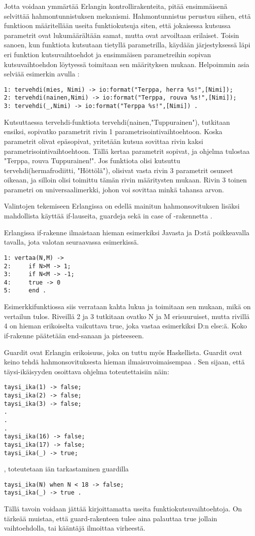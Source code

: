 \documentclass[11pt,oneside,a4paper]{article}
\begin{document}
Jotta voidaan ymmärtää Erlangin kontrollirakenteita, pitää ensimmäisenä
selvittää hahmontunnistuksen mekanismi. Hahmontunnistus perustuu siihen, että
funktioon määritellään useita funktiokutsuja siten, että jokaisessa kutsussa
parametrit ovat lukumäärältään samat, mutta ovat arvoiltaan erilaiset. Toisin sanoen, kun 
funktiota kutsutaan tietyllä parametrilla, käydään järjestyksessä läpi eri
funktion kutsuvaihtoehdot ja ensimmäisen parametreihin sopivan
kutsuvaihtoehdon löytyessä toimitaan sen määrityksen mukaan. Helpoimmin asia
selviää esimerkin avulla \cite{HEB13}: 
\begin{verbatim}
1: tervehdi(mies, Nimi) -> io:format("Terppa, herra %s!",[Nimi]);
2: tervehdi(nainen,Nimi) -> io:format("Terppa, rouva %s!",[Nimi]);
3: tervehdi(_,Nimi) -> io:format("Terppa %s!",[Nimi]) . 
\end{verbatim}
Kutsuttaessa tervehdi-funktiota tervehdi(nainen,"Tuppurainen"), tutkitaan
ensiksi, sopivatko parametrit rivin 1 parametrisointivaihtoehtoon. Koska
parametrit olivat epäsopivat, 
yritetään kutsua sovittaa rivin kaksi parametrisointivaihtoehtoon. Tällä kertaa
parametrit sopivat, ja ohjelma tulostaa "Terppa, rouva Tuppurainen!". Jos
funktiota olisi kutsuttu
tervehdi(hermafrodiitti, "Höttölä"), olisivat vasta rivin 3 parametrit osuneet
oikeaan, ja silloin olisi toimittu tämän rivin määritysten mukaan. 
Rivin 3 toinen parametri on universaalimerkki, 
johon voi sovittaa minkä tahansa arvon.

Valintojen tekemiseen Erlangissa on edellä mainitun hahmonsovituksen lisäksi
mahdollista
käyttää if-lauseita, guardeja sekä in case of -rakennetta \cite{HEB13}.

Erlangissa if-rakenne ilmaistaan hieman esimerkiksi Javasta ja D:stä
poikkeavalla
tavalla, jota valotan seuraavassa esimerkissä. 

\begin{verbatim}
1: vertaa(N,M) -> 
2:     if N>M -> 1;
3:     if N<M -> -1;
4:     true -> 0
5:     end . 
\end{verbatim}
Esimerkkifunktiossa siis verrataan kahta lukua ja toimitaan sen
mukaan, mikä on vertailun tulos. Riveillä 2 ja 3 tutkitaan ovatko N ja M
erisuuruiset, mutta rivillä 4 on hieman erikoiselta
vaikuttava true, joka vastaa esimerkiksi D:n else:ä. Koko if-rakenne päätetään
end-sanaan ja pisteeseen. 

Guardit ovat Erlangin erikoisuus, joka on tuttu myös Haskellista. Guardit
ovat keino tehdä hahmonsovituksesta hieman ilmaisuvoimaisempaa \cite{HEB13}. Sen
sijaan, että
täysi-ikäisyyden osoittava ohjelma 
toteutettaisiin näin: 
\begin{verbatim}
taysi_ika(1) -> false;
taysi_ika(2) -> false;
taysi_ika(3) -> false;
.
.
.
taysi_ika(16) -> false;
taysi_ika(17) -> false;
taysi_ika(_) -> true;
\end{verbatim}
, toteutetaan iän tarkastaminen guardilla
\begin{verbatim}
taysi_ika(N) when N < 18 -> false;
taysi_ika(_) -> true . 
\end{verbatim}
Tällä tavoin voidaan jättää kirjoittamatta useita funktiokutsuvaihtoehtoja. 
On tärkeää muistaa, että guard-rakenteen tulee aina palauttaa true jollain
vaihtoehdolla, tai kääntäjä ilmoittaa virheestä.  
\end{document}
